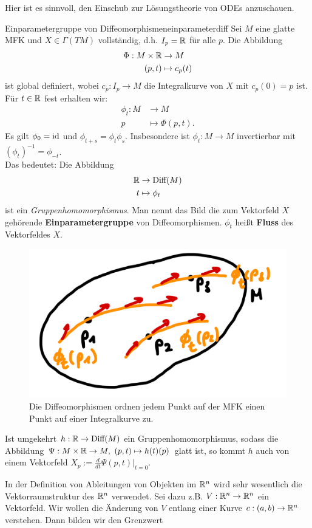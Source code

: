 Hier ist es sinnvoll, den Einschub zur Lösungstheorie von ODEs anzuschauen.
\begin{satz}{Einparametergruppe von Diffeomorphismen}{einparameterdiff}
Sei $M$ eine glatte MFK und $X \in \Gamma(TM)$ vollständig, d.h. $I_p = \mathbb{R}$ für alle $p$. Die Abbildung
\begin{align}
\Phi: M \times \mathbb{R} &\to M \\
(p,t) &\mapsto c_p(t)
\end{align}
ist global definiert, wobei $c_p: I_p \to M$ die Integralkurve von $X$ mit $c_p(0)=p$ ist. Für $t \in \mathbb{R}$ fest erhalten wir:
\begin{align}
\phi_t: M &\to M \\
p &\mapsto \Phi(p,t).
\end{align}
Es gilt $\phi_0 =\text{id}$ und $\phi_{t+s}=\phi_t\phi_s$. Insbesondere ist $\phi_t: M \to M$ invertierbar mit $(\phi_t)^{-1}=\phi_{-t}$.\\
Das bedeutet: Die Abbildung
\begin{align}
\mathbb{R} &\to \text{Diff}(M)\\
t &\mapsto \phi_t
\end{align}
ist ein \textit{Gruppenhomomorphismus}. Man nennt das Bild die zum Vektorfeld $X$ gehörende \textbf{Einparametergruppe} von Diffeomorphismen. $\phi_t$ heißt \textbf{Fluss} des Vektorfeldes $X$.
\begin{figure}[H]
\label{fig:fluss}
\centering
\includegraphics[width=0.25\linewidth]{Bilder/diffgruppe.png}
\caption{Die Diffeomorphismen ordnen jedem Punkt auf der MFK einen Punkt auf einer Integralkurve zu.}
\end{figure}
\end{satz}
\begin{bemerkung}
Ist umgekehrt $h: \mathbb{R} \to \text{Diff}(M)$ ein Gruppenhomomorphismus, sodass die Abbildung $\Psi: M \times \mathbb{R} \to M, \ (p, t) \mapsto h(t)(p)$ glatt ist, so kommt $h$ auch von einem Vektorfeld $X_p := \frac{d}{dt} \Psi(p,t)|_{t=0}$.
\end{bemerkung}
In der Definition von Ableitungen von Objekten im $\mathbb{R}^n$ wird sehr wesentlich die Vektorraumstruktur des $\mathbb{R}^n$ verwendet. Sei dazu z.B. $V: \mathbb{R}^n \to \mathbb{R}^n$ ein Vektorfeld. Wir wollen die Änderung von $V$ entlang einer Kurve $c: (a,b) \to \mathbb{R}^n$ verstehen. Dann bilden wir den Grenzwert
